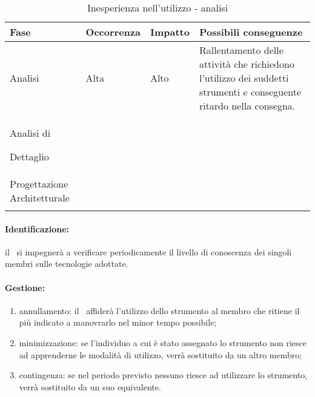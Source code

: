 \documentclass[../PianoProgetto.tex]{subfiles}
\begin{document}
	\begin{table} [h]
		\centering
		\begin{tabularx}{\textwidth}{F O O P}
			\toprule
			\textbf{Fase} & \textbf{Occorrenza} & \textbf{Impatto} & \textbf{Possibili conseguenze}\\
			\midrule
			Analisi & Alta & Alto & Rallentamento delle attività che richiedono l'utilizzo dei suddetti strumenti e conseguente ritardo nella consegna. \\
			\midrule
			Analisi di \par Dettaglio & & & \\
			\midrule
			Progettazione Architetturale & & & \\
			\bottomrule
		\end{tabularx}
		\caption{Inesperienza nell'utilizzo - analisi}
		\label{tab:Inesperienza nell'utilizzo - analisi}	
	\end{table}	
	
	\paragraph*{Identificazione:} il \responsabilediprogetto\ si impegnerà a verificare periodicamente il livello di conoscenza dei singoli membri sulle tecnologie adottate.
	
	\paragraph*{Gestione:}
	\begin{enumerate}
		\item annullamento: il \responsabilediprogetto\ affiderà l'utilizzo dello strumento al membro che ritiene il più indicato a manovrarlo nel minor tempo possibile;
		\item minimizzazione: se l'individuo a cui è stato assegnato lo strumento non riesce ad apprenderne le modalità di utilizzo, verrà sostituito da un altro membro;
		\item contingenza: se nel periodo previsto nessuno riesce ad utilizzare lo strumento, verrà sostituito da un suo equivalente. 
	\end{enumerate}		
	
\end{document}
